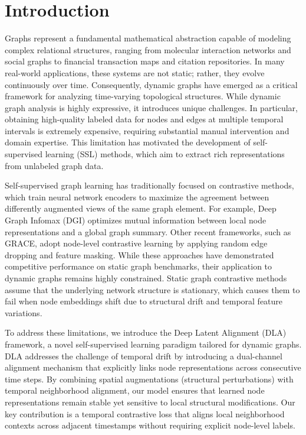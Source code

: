 \section{Introduction}
Graphs represent a fundamental mathematical abstraction capable of modeling complex relational structures, ranging from molecular interaction networks and social graphs to financial transaction maps and citation repositories. In many real-world applications, these systems are not static; rather, they evolve continuously over time. Consequently, dynamic graphs have emerged as a critical framework for analyzing time-varying topological structures. While dynamic graph analysis is highly expressive, it introduces unique challenges. In particular, obtaining high-quality labeled data for nodes and edges at multiple temporal intervals is extremely expensive, requiring substantial manual intervention and domain expertise. This limitation has motivated the development of self-supervised learning (SSL) methods, which aim to extract rich representations from unlabeled graph data.

Self-supervised graph learning has traditionally focused on contrastive methods, which train neural network encoders to maximize the agreement between differently augmented views of the same graph element. For example, Deep Graph Infomax (DGI) optimizes mutual information between local node representations and a global graph summary. Other recent frameworks, such as GRACE, adopt node-level contrastive learning by applying random edge dropping and feature masking. While these approaches have demonstrated competitive performance on static graph benchmarks, their application to dynamic graphs remains highly constrained. Static graph contrastive methods assume that the underlying network structure is stationary, which causes them to fail when node embeddings shift due to structural drift and temporal feature variations.

To address these limitations, we introduce the Deep Latent Alignment (DLA) framework, a novel self-supervised learning paradigm tailored for dynamic graphs. DLA addresses the challenge of temporal drift by introducing a dual-channel alignment mechanism that explicitly links node representations across consecutive time steps. By combining spatial augmentations (structural perturbations) with temporal neighborhood alignment, our model ensures that learned node representations remain stable yet sensitive to local structural modifications. Our key contribution is a temporal contrastive loss that aligns local neighborhood contexts across adjacent timestamps without requiring explicit node-level labels.
